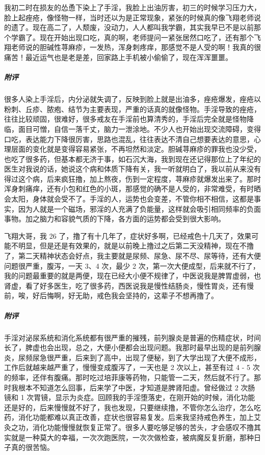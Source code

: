 \begin{case}
    我初二时在损友的怂恿下染上了手淫，我脸上出油厉害，初三的时候学习压力大，脸上起痤疮，像怪物一样，当时还以为是正常现象，紧张的时候真的像飞翔老师说的遗了。现在高二了，人颓废，没动力，人人都叫我学霸，其实我早已不是以前那个学霸了。现在开始出现口吃，真的啊，老师提问一紧张居然口吃了，还有那个飞翔老师说的胆碱性荨麻疹，一发热，浑身刺疼痒，那感觉不是人受的啊！我真的很痛苦！最近运气也是老是差，回家路上手机被小偷偷了，现在浑浑噩噩。
    \subparagraph{附评} 很多人染上手淫后，内分泌就失调了，反映到脸上就是出油多，痤疮爆发，痤疮以粉刺、丘疹、脓疱、结节为主要表现，严重的话真的就像怪物。手淫导致的痤疮，往往比较顽固，很难好，很多戒友在手淫前也算清秀的，手淫后完全就是怪物降临，面目可憎，自信一落千丈，脑力一泄涂地。不少人也开始出现交流障碍，变得口吃，表达能力下降很厉害，思路也混乱，往往表达不清自己想要表达的意思，心理层面的变化就是变得容易紧张，不再坦然和淡定。胆碱荨麻疹的罪我也没少受，也吃了很多药，但基本都无济于事，如石沉大海，我到现在还记得那位上了年纪的医生对我说的话，她说这个病和体质下降有关，我一听就明白了，我以前从来没有得过这个病，后来疯狂撸，加上熬夜，伤到一定程度，荨麻疹就爆发出来了。那时浑身刺痛痒，还有小包和红色的小斑，那感觉的确不是人受的，非常难受，有时晒会太阳，身体就会受不了。手淫的人，运势也会变差，不管你相不相信，这都是事实，因为人就是一个磁场，邪淫的人充满了负能量，这样就会吸引相同频率的负面事物。加之脑力和容貌气质的下降，各方面的运势都会受到很大影响。
\end{case}

\begin{case}
    飞翔大哥，我 26 了，撸了有十几年了，症状好多啊，已经戒色十几天了，效果可能不明显，但是还是有效果的，就是以前晚上撸过之后第二天没精神，现在不撸了，第二天精神状态会好点，我主要就是尿频、尿急、尿不尽、尿等待，还有大便问题很严重，腹泻，一天 3、4 次，最少 2 次，第一次大便成型，后来就不行了，我的问题最重要的就是两便，现在已经大小便不规律了，中医说我是脾胃虚弱，也肾虚，看了好多医生，吃了很多药，西医说我是慢性结肠炎，慢性胃炎，还有慢前，唉，好后悔啊，好无助，戒色我会坚持的，这辈子不想再撸了。
    \subparagraph{附评} 手淫对泌尿系统和消化系统都有很严重的摧残，前列腺炎是普遍的伤精症状，时间长了，脾虚也会出现，总之，大便小便都会出现问题。我那时最早出现的是前列腺炎，尿频尿急很严重，后来到了高中，出现了便秘，到了大学出现了大便不成形，工作后就越来越严重了，慢慢变成腹泻了，一天也是 2 次以上，甚至有过 4 - 5 次的频率，还伴有腹痛。那时吃过培菲康等药物，只能管一二天，然后就不行了。那时我根本不知道怎么回事，后来学了中医，才知道是脾肾阳虚。曾经做过 2 次肠镜和 1 次胃镜，显示为炎症。回顾我的手淫堕落史，在刚开始的时候，消化功能还是好的，后来慢慢就不好了，我也发现，只要继续撸，不管你怎么治疗，怎么吃药，消化功能都难以真正改善，症状也很容易复发。后来我坚持戒色养生，加上艾灸之功，消化功能慢慢就恢复正常了。很多人要吃够足够的苦头，才会感叹不撸其实就是一种莫大的幸福，一次次跑医院，一次次做检查，被病魔反复折磨，那种日子真的很苦恼。
\end{case}

